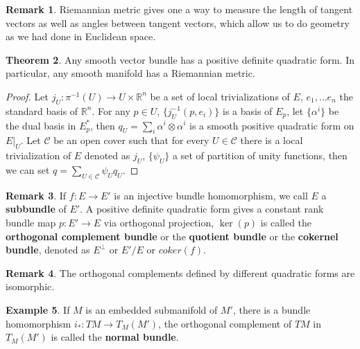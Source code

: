 \documentclass{article}
\theoremstyle{definition}
\newtheorem{thm}{Theorem}[section]
\newtheorem{rmk}[thm]{Remark}
\newtheorem{exm}[thm]{Example}
\begin{document}
\begin{rmk}
    Riemannian metric gives one a way to measure the length of tangent vectors as well as angles between tangent vectors, which allow us to do geometry as we had done in Euclidean space.
\end{rmk}

\begin{thm}
    Any smooth vector bundle has a positive definite quadratic form. In particular, any smooth manifold has a Riemannian metric.
\end{thm}

\begin{proof}
    Let $j_U: \pi^{-1}(U)\rightarrow U\times\mathbb{R}^n$ be a set of local trivializations of $E$, $e_1, \dots e_n$ the standard basis of $\mathbb{R}^n$. For any $p\in U$, $\{j_U^{-1}(p, e_i)\}$ is a basis of $E_p$, let $\{\alpha^i\}$ be the dual basis in $E_p^*$, then $q_U=\sum_i\alpha^i\otimes\alpha^i$ is a smooth positive quadratic form on $E|_U$. Let $\mathcal{C}$ be an open cover such that for every $U\in \mathcal{C}$ there is a local trivialization of $E$ denoted as $j_U$, $\{\psi_U\}$ a set of partition of unity functions, then we can set $q=\sum_{U\in\mathcal{C}}\psi_Uq_U$.
\end{proof}

\begin{rmk}
    If $f: E\rightarrow E'$ is an injective bundle homomorphism, we call $E$ a {\bf subbundle} of $E'$. A positive definite quadratic form gives a constant rank bundle map $p: E'\rightarrow E$ via orthogonal projection, $\ker(p)$ is called the {\bf orthogonal complement bundle} or the {\bf quotient bundle} or the {\bf cokernel bundle}, denoted as $E^\perp$ or $E'/E$ or $coker(f)$.
\end{rmk} 

\begin{rmk}
    The orthogonal complements defined by different quadratic forms are isomorphic.
\end{rmk}


\begin{exm}
    If $M$ is an embedded submanifold of $M'$, there is a bundle homomorphism $i_*: TM\rightarrow T_M(M')$, the orthogonal complement of $TM$ in $T_M(M')$ is called the {\bf normal bundle}. 
\end{exm}
\end{document}
